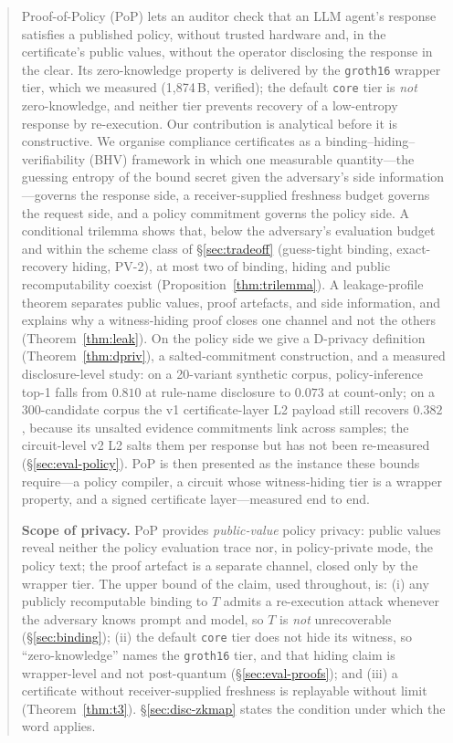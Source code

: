 \documentclass[10pt,journal,compsoc]{IEEEtran}
\begin{document}
\begin{abstract}
Proof-of-Policy (PoP) lets an auditor check that an LLM agent's response satisfies
a published policy, without trusted hardware and, in the certificate's public
values, without the operator disclosing the response in the clear. Its
zero-knowledge property is delivered by the \texttt{gr\-oth16} wrapper tier,
which we measured (1{,}874\,B, verified); the default \texttt{core} tier is
\emph{not} zero-knowledge, and neither tier prevents recovery of a low-entropy
response by re-execution. Our contribution is analytical before it is
constructive. We organise compliance certificates as a
binding--hiding--verifiability (BHV) framework in which one measurable
quantity---the guessing entropy of the bound secret given the adversary's side
information---governs the response side, a receiver-supplied freshness budget
governs the request side, and a policy commitment governs the policy side. A
conditional trilemma shows that, below the adversary's evaluation budget and
within the scheme class of \S\ref{sec:tradeoff} (guess-tight binding,
exact-recovery hiding, PV-2), at most two of binding, hiding and public
recomputability coexist (Proposition~\ref{thm:trilemma}). A leakage-profile
theorem separates public values, proof artefacts, and side information, and
explains why a witness-hiding proof closes one channel and not the others
(Theorem~\ref{thm:leak}). On the policy side we give a D-privacy definition
(Theorem~\ref{thm:dpriv}), a salted-commitment construction, and a measured
disclosure-level study: on a 20-variant synthetic corpus, policy-inference top-1
falls from $0.810$ at rule-name disclosure to $0.073$ at count-only; on a
300-candidate corpus the v1 certificate-layer L2 payload still recovers
$0.382$, because its unsalted evidence commitments link across samples; the
circuit-level v2 L2 salts them per response but has not been re-measured
(\S\ref{sec:eval-policy}). PoP is then presented as the instance these bounds
require---a policy compiler, a circuit whose witness-hiding tier is a wrapper
property, and a signed certificate layer---measured end to end.

\smallskip
\noindent\textbf{Scope of privacy.} PoP provides \emph{public-value} policy
privacy: public values reveal neither the policy evaluation trace nor, in
policy-private mode, the policy text; the proof artefact is a separate channel,
closed only by the wrapper tier. The upper bound of the claim, used throughout,
is: (i) any publicly recomputable binding to $T$ admits a re-execution attack
whenever the adversary knows prompt and model, so $T$ is \emph{not}
unrecoverable (\S\ref{sec:binding}); (ii) the default \texttt{core} tier does not
hide its witness, so ``zero-knowledge'' names the \texttt{gr\-oth16} tier, and
that hiding claim is wrapper-level and not post-quantum
(\S\ref{sec:eval-proofs}); and (iii) a certificate without receiver-supplied
freshness is replayable without limit (Theorem~\ref{thm:t3}).
\S\ref{sec:disc-zkmap} states the condition under which the word applies.
\end{abstract}
\end{document}
